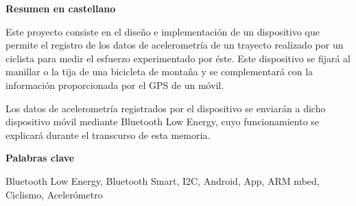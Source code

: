 
\newpage

\thispagestyle{empty}

\begin{center}

{\bf \Huge Resumen en castellano}

  \end{center}
\vspace{1cm}

Este proyecto consiste en el diseño e implementación de un dispositivo que permite el registro de los datos de acelerometría de un trayecto realizado por un ciclista para medir el esfuerzo experimentado por éste. Este dispositivo se fijará al manillar o la tija de una bicicleta de montaña y se complementará con la información proporcionada por el GPS de un móvil.

Los datos de acelerometría registrados por el dispositivo se enviarán a dicho dispositivo móvil mediante Bluetooth Low Energy, cuyo funcionamiento se explicará durante el transcurso de esta memoria.

\vspace{1cm}


\begin{center}

{\bf \Large Palabras clave}

\end{center}

   \vspace{0.5cm}
   
   Bluetooth Low Energy, Bluetooth Smart, I2C, Android, App, ARM mbed, Ciclismo, Acelerómetro
   


